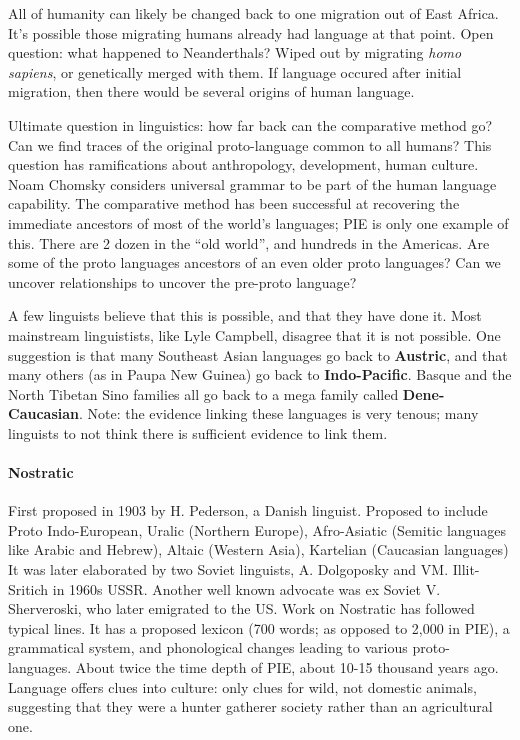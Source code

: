 \documentclass{exam}
\begin{document}
\noindent All of humanity can likely be changed back to one migration out of East Africa. 
It's possible those migrating humans already had language at that point. 
Open question: what happened to Neanderthals? Wiped out by migrating \textit{homo sapiens}, or genetically merged with them.  
If language occured after initial migration, then there would be several origins of human language. 

Ultimate question in linguistics: how far back can the comparative method go? Can we find traces of the original proto-language common to all humans? 
This question has ramifications about anthropology, development, human culture. 
Noam Chomsky considers universal grammar to be part of the human language capability.  
The comparative method has been successful at recovering the immediate ancestors of most of the world's languages; PIE is only one example of this. 
There are 2 dozen in the ``old world'', and hundreds in the Americas. 
Are some of the proto languages ancestors of an even older proto languages?
Can we uncover relationships to uncover the pre-proto language?

A few linguists believe that this is possible, and that they have done it. 
Most mainstream linguistists, like Lyle Campbell, disagree that it is not possible.
One suggestion is that many Southeast Asian languages go back to \textbf{Austric}, and that many others (as in Paupa New Guinea) go back to \textbf{Indo-Pacific}. 
Basque and the North Tibetan Sino families all go back to a mega family called \textbf{Dene-Caucasian}. 
Note: the evidence linking these languages is very tenous; many linguists to not think there is sufficient evidence to link them. 


\paragraph{Nostratic}First proposed in 1903 by H. Pederson, a Danish linguist. 
Proposed to include Proto Indo-European, Uralic (Northern Europe), Afro-Asiatic (Semitic languages like Arabic and Hebrew), Altaic (Western Asia), Kartelian (Caucasian languages)
It was later elaborated by two Soviet linguists, A. Dolgoposky and VM. Illit-Sritich in 1960s USSR. 
Another well known advocate was ex Soviet V. Sherveroski, who later emigrated to the US. 
Work on Nostratic has followed typical lines. 
It has a proposed lexicon (700 words; as opposed to 2,000 in PIE), a grammatical system, and phonological changes leading to various proto-languages. 
About twice the time depth of PIE, about 10-15 thousand years ago. 
Language offers clues into culture: only clues for wild, not domestic animals, suggesting that they were a hunter gatherer society rather than an agricultural one.  
\end{document}

